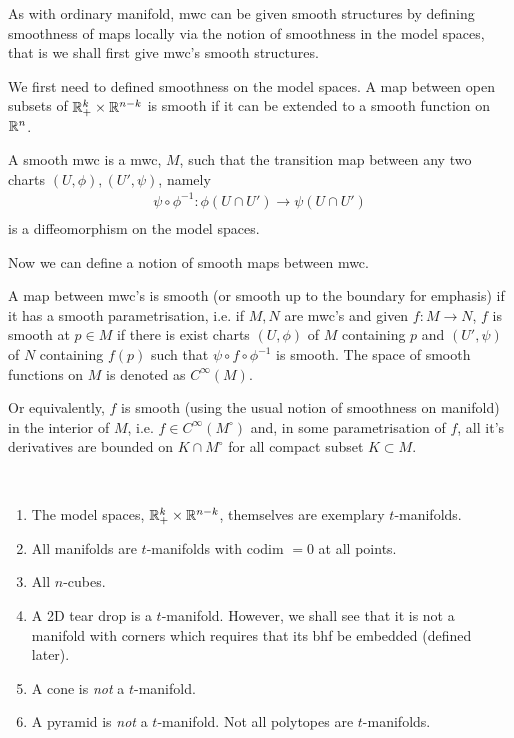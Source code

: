 \documentclass{article}
\begin{document}
As with ordinary manifold, mwc can be given smooth structures by defining smoothness of maps locally via the notion of smoothness in the model spaces, that is we shall first give mwc's smooth structures. 

\begin{fdefinition}
We first need to defined smoothness on the model spaces. A map between open subsets of ${\mathbb R}^k_+ \times {\ensuremath {\mathbb R}}^{n - k}$ is smooth if it can be extended to a smooth function on ${\mathbb R}^n$. 

\noindent A smooth mwc is a mwc, $M$, such that the transition map between any two charts $(U, \phi), (U', \psi)$, namely
\begin{align*}
\psi \circ \phi^{-1} : \phi(U \cap U') \to \psi(U \cap U') \\
\end{align*}
is a diffeomorphism on the model spaces. 
\end{fdefinition}

\noindent Now we can define a notion of smooth maps between mwc. 
\begin{fdefinition}
A map between mwc's is smooth (or smooth up to the boundary for emphasis) if it has a smooth parametrisation, i.e. if $M, N$ are mwc's and given $f: M \to N$, $f$ is smooth at $p \in M$ if there is exist charts $(U, \phi)$ of $M$ containing $p$ and $(U', \psi)$ of $N$ containing $f(p)$ such that $\psi \circ f \circ \phi^{-1}$ is smooth. The space of smooth functions on $M$ is denoted as $C^\infty(M)$. 

\noindent Or equivalently, $f$ is smooth (using the usual notion of smoothness on manifold) in the interior of $M$, i.e. $f \in C^\infty(M^\circ)$ and, in some parametrisation of $f$, all it's derivatives are bounded on $K \cap M^\circ$ for all compact subset $K \subset M$.  
\end{fdefinition}



\begin{exmp}[$t$-manifolds] \hfill \\
\begin{enumerate}
\item The model spaces, ${\mathbb R}^k_+ \times {\ensuremath {\mathbb R}}^{n - k}$, themselves are exemplary $t$-manifolds. 
\item All manifolds are $t$-manifolds with codim $ = 0$ at all points. 
\item All $n$-cubes. 
\item A 2D tear drop is a $t$-manifold. However, we shall see that it is not a manifold with corners which requires that its bhf be embedded (defined later). 
\item A cone is \emph{not} a $t$-manifold. 
\item A pyramid is \emph{not} a $t$-manifold. Not all polytopes are $t$-manifolds.
\end{enumerate}
\end{exmp}
\end{document}
